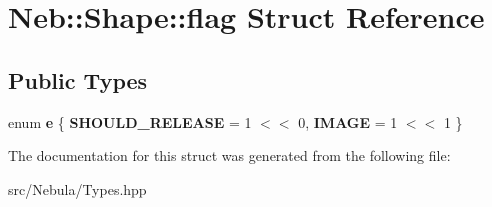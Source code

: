\hypertarget{structNeb_1_1Shape_1_1flag}{\section{\-Neb\-:\-:\-Shape\-:\-:flag \-Struct \-Reference}
\label{structNeb_1_1Shape_1_1flag}
}
\subsection*{\-Public \-Types}
\begin{DoxyCompactItemize}
\item 
enum {\bfseries e} \{ {\bfseries \-S\-H\-O\-U\-L\-D\-\_\-\-R\-E\-L\-E\-A\-S\-E} =  1 $<$$<$ 0, 
{\bfseries \-I\-M\-A\-G\-E} =  1 $<$$<$ 1
 \}
\end{DoxyCompactItemize}


\-The documentation for this struct was generated from the following file\-:\begin{DoxyCompactItemize}
\item 
src/\-Nebula/\-Types.\-hpp\end{DoxyCompactItemize}
